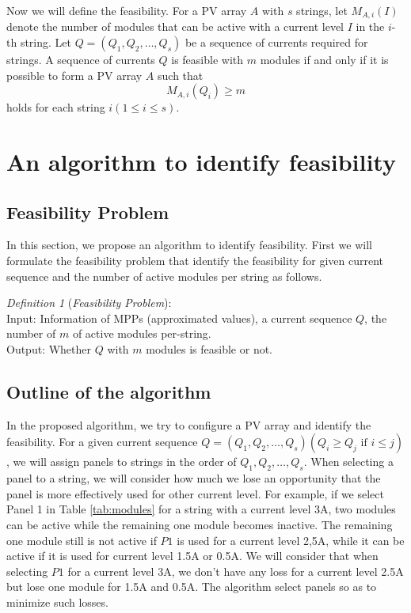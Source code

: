 \documentclass[conference]{pvsctran}
\begin{document}
Now we will define the feasibility. For a PV array $A$ with $s$ strings, let $M_{A,i}(I)$ denote the number of modules that can be active with a current level $I$ in the $i$-th string.
Let $Q = (Q_{1},Q_{2},\ldots ,Q_{s})$ be a sequence of currents required for strings. 
A sequence of currents $Q$ is feasible with $m$ modules if and only if it is possible to form a PV array $A$ such that 
\begin{equation}
M_{A,i}(Q_{i}) \geq m
\end{equation}
holds for each string $i (1 \leq i \leq s)$.

\section{An algorithm to identify feasibility}\label{Sec5}
\subsection{Feasibility Problem}\label{Sec5_1}
In this section, we propose an algorithm to identify feasibility.
First we will formulate the feasibility problem that identify the feasibility for given current sequence and the number of active modules per string as follows.

\textit{Definition 1} (\textit{Feasibility Problem}):\\
Input: Information of MPPs (approximated values), a current sequence $Q$, the number of $m$ of active modules per-string.\\
Output: Whether $Q$ with $m$ modules is feasible or not.

\subsection{Outline of the algorithm}
In the proposed algorithm, we try to configure a PV array and identify the feasibility. 
For a given current sequence $Q = (Q_{1},Q_{2},\ldots ,Q_{s}) (Q_{i} \geq Q_{j} \mbox{\ if\ } i \leq j)$, we will assign panels to strings in the order of $Q_{1},Q_{2},\ldots ,Q_{s}$. 
When selecting a panel to a string, we will consider how much we lose an opportunity that the panel is more effectively used for other current level. 
For example, if we select Panel 1 in Table \ref{tab:modules} for a string with a current level 3A, two modules can be active while the remaining one module becomes inactive. 
The remaining one module still is not active if $P1$ is used for a current level 2,5A, while it can be active if it is used for current level 1.5A or 0.5A. 
We will consider that when selecting $P1$ for a current level 3A, we don't have any loss for a current level 2.5A but lose one module for 1.5A and 0.5A. 
The algorithm select panels so as to minimize such losses. 
\end{document}

